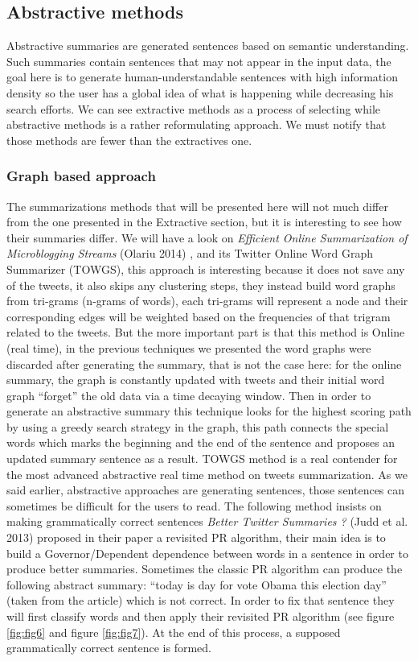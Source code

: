\documentclass[runningheads]{llncs}
\begin{document}
\subsection{Abstractive methods}

Abstractive summaries are generated sentences based on semantic understanding.
Such summaries contain sentences that may not appear in the input data, the
goal here is to generate human-understandable sentences with high information
density so the user has a global idea of what is happening while decreasing his
search efforts. We can see extractive methods as a process of selecting while
abstractive methods is a rather reformulating approach. We must notify that
those methods are fewer than the extractives one.

\subsubsection{Graph based approach}

The summarizations methods that will be presented here will not much differ
from the one presented in the Extractive section, but it is interesting to see
how their summaries differ. We will have a look on \textit{Efficient Online
Summarization of Microblogging Streams} (Olariu 2014)
\cite{olariu_efficient_2014}, and its Twitter Online Word Graph Summarizer
(TOWGS), this approach is interesting because it does not save any of the
tweets, it also skips any clustering steps, they instead build word graphs from
tri-grams (n-grams of words), each tri-grams will represent a node and their
corresponding edges will be weighted based on the frequencies of that trigram
related to the tweets. But the more important part is that this method is
Online (real time), in the previous techniques we presented the word graphs
were discarded after generating the summary, that is not the case here: for the
online summary, the graph is constantly updated with tweets and their initial
word graph ``forget'' the old data via a time decaying window. Then in order to
generate an abstractive summary this technique looks for the highest scoring
path by using a greedy search strategy in the graph, this path connects the
special words which marks the beginning and the end of the sentence and
proposes an updated summary sentence as a result. TOWGS method is a real
contender for the most advanced abstractive real time method on tweets
summarization. As we said earlier, abstractive approaches are generating
sentences, those sentences can sometimes be difficult for the users to read.
The following method insists on making grammatically correct sentences
\textit{Better Twitter Summaries ?} (Judd et al. 2013) \cite{judd_better_2013}
proposed in their paper a revisited PR algorithm, their main idea is to build a
Governor/Dependent dependence between words in a sentence in order to produce
better summaries. Sometimes the classic PR algorithm can produce the following
abstract summary: ``today is day for vote Obama this election day'' (taken
from the article) which is not correct. In order to fix that sentence they will
first classify words and then apply their revisited PR algorithm (see figure
\ref{fig:fig6} and figure \ref{fig:fig7}). At the end of this process, a supposed
grammatically correct sentence is formed.
\end{document}
